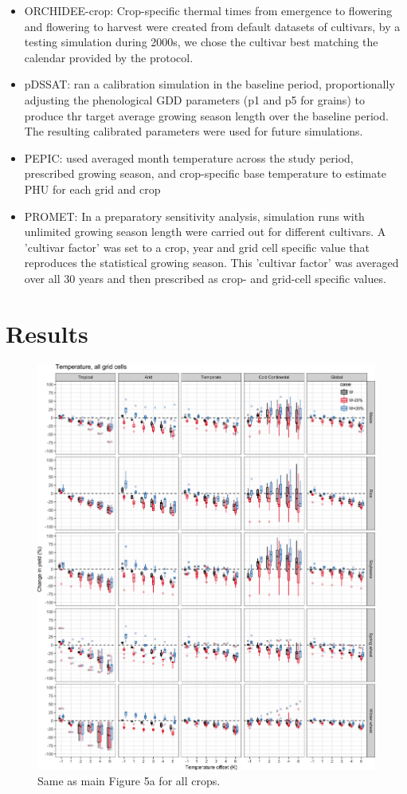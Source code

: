 \documentclass[10pt]{article}
\begin{document}
\begin{itemize}
    \item ORCHIDEE-crop: Crop-specific thermal times from emergence to flowering and flowering to harvest were created from default datasets of cultivars, by a testing simulation during 2000s, we chose the cultivar best matching the  calendar provided by the protocol.
    \item pDSSAT: ran a calibration simulation in the baseline period, proportionally adjusting the phenological GDD parameters (p1 and p5 for grains) to produce thr target average growing season length over the baseline period. The resulting calibrated parameters were used for future simulations. 
    \item PEPIC: used averaged month temperature across the study period, prescribed growing season, and crop-specific base temperature to estimate PHU for each grid and crop
    \item PROMET: In a preparatory sensitivity analysis, simulation runs with unlimited growing season length were carried out for different cultivars. A 'cultivar factor' was set to a crop, year and grid cell specific value that reproduces the statistical growing season. This 'cultivar factor'  was averaged over all 30 years and then prescribed as crop- and grid-cell specific values.
\end{itemize}

\clearpage
\section{Results}

\begin{figure}[h!]
    \centering
    \includegraphics[width=\textwidth]{s_sim_CG_T.png}
    \caption{Same as main Figure 5a for all crops.}
    \label{fig:temperautre}
\end{figure}
\end{document}
